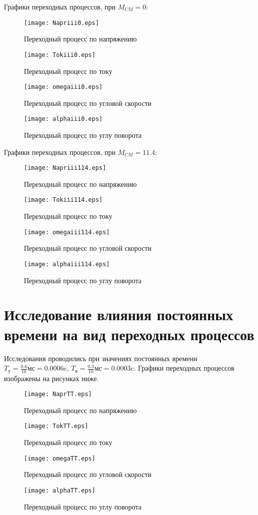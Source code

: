 \documentclass[12pt,a4paper]{article}
\begin{document}
Графики переходных процессов, при $M_{CM}=0$: 
\begin{figure}[H]
	\centering
	\texttt{[image: Napriii0.eps]}
	\caption{Переходный процесс по напряжению}
\end{figure}	
\begin{figure}[H]	
	 \centering
	\texttt{[image: Tokiii0.eps]}
	\caption{Переходный процесс по току}
\end{figure}
\begin{figure}[H]	
	 \centering
	\texttt{[image: omegaiii0.eps]}
	\caption{Переходный процесс по угловой скорости}
\end{figure}
\begin{figure}[H]
	 \centering
	\texttt{[image: alphaiii0.eps]}
	\caption{Переходный процесс по углу поворота}
\end{figure}
Графики переходных процессов, при $M_{CM}=11.4$:
\begin{figure}[H]
	\centering
	\texttt{[image: Napriii114.eps]}
	\caption{Переходный процесс по напряжению}
\end{figure}	
\begin{figure}[H]
	 \centering	
	\texttt{[image: Tokiii114.eps]}
	\caption{Переходный процесс по току}
\end{figure}
\begin{figure}[H]	
	 \centering
	\texttt{[image: omegaiii114.eps]}
	\caption{Переходный процесс по угловой скорости}
\end{figure}
\begin{figure}[H]
	 \centering
	\texttt{[image: alphaiii114.eps]}
	\caption{Переходный процесс по углу поворота}
\end{figure}

\newpage
\section{Исследование влияния постоянных времени на вид переходных процессов}
Исследования проводились при значениях постоянных времени $T_\text{у} = \frac{0.6}{10} \text{мс} = 0.0006$c, $T_\text{я} = \frac{0.3}{10} \text{мс} = 0.0003$c. Графики переходных процессов изображены на рисунках ниже.
\begin{figure}[H]
	\centering
	\texttt{[image: NaprTT.eps]}
	\caption{Переходный процесс по напряжению}
\end{figure}	
\begin{figure}[H]	
	 \centering
	\texttt{[image: TokTT.eps]}
	\caption{Переходный процесс по току}
\end{figure}
\begin{figure}[H]	
	 \centering
	\texttt{[image: omegaTT.eps]}
	\caption{Переходный процесс по угловой скорости}
\end{figure}
\begin{figure}[H]
	 \centering
	\texttt{[image: alphaTT.eps]}
	\caption{Переходный процесс по углу поворота}
\end{figure}
\end{document}
